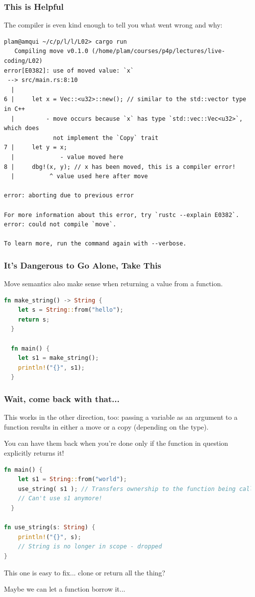 \begin{frame}[fragile]
\frametitle{This is Helpful}

The compiler is even kind enough to tell you what went wrong and why:

{\scriptsize
\begin{verbatim}
plam@amqui ~/c/p/l/l/L02> cargo run
   Compiling move v0.1.0 (/home/plam/courses/p4p/lectures/live-coding/L02)
error[E0382]: use of moved value: `x`
 --> src/main.rs:8:10
  |
6 |     let x = Vec::<u32>::new(); // similar to the std::vector type in C++
  |         - move occurs because `x` has type `std::vec::Vec<u32>`, which does 
              not implement the `Copy` trait
7 |     let y = x;
  |             - value moved here
8 |     dbg!(x, y); // x has been moved, this is a compiler error!
  |          ^ value used here after move

error: aborting due to previous error

For more information about this error, try `rustc --explain E0382`.
error: could not compile `move`.

To learn more, run the command again with --verbose.
\end{verbatim}
}
\end{frame}


\begin{frame}[fragile]
\frametitle{It's Dangerous to Go Alone, Take This}

Move semantics also make sense when returning a value from a function.

\begin{lstlisting}[language=Rust]
  fn make_string() -> String {
    let s = String::from("hello");
    return s;
  }

  fn main() {
    let s1 = make_string();
    println!("{}", s1);
  }
\end{lstlisting}

\end{frame}


\begin{frame}[fragile]
\frametitle{Wait, come back with that...}

This works in the other direction, too: passing a variable as an argument to a function results in either a move or a copy (depending on the type).

You can have them back when you're done only if the function in question explicitly returns it! 


\begin{lstlisting}[language=Rust]
  fn main() {
    let s1 = String::from("world");
	use_string( s1 ); // Transfers ownership to the function being called
	// Can't use s1 anymore!
  }
  
fn use_string(s: String) {
    println!("{}", s); 
    // String is no longer in scope - dropped
}
\end{lstlisting}

This one is easy to fix... clone or return all the thing?

Maybe we can let a function borrow it...

\end{frame}


